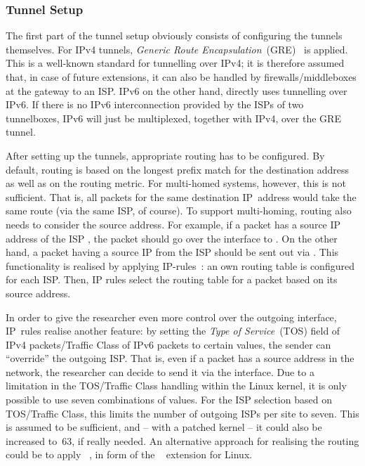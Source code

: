 \subsubsection{Tunnel Setup}

The first part of the tunnel setup obviously consists of configuring the tunnels themselves. For IPv4 tunnels, \emph{Generic Route Encapsulation}~(GRE)~\cite{RFC2784} is applied. This is a well-known standard for tunnelling over IPv4; it is therefore assumed that, in case of future extensions, it can also be handled by firewalls/middleboxes at the gateway to an ISP. IPv6 on the other hand, directly uses tunnelling over IPv6. If there is no IPv6 interconnection provided by the ISPs of two tunnelboxes, IPv6 will just be multiplexed, together with IPv4, over the GRE tunnel.

After setting up the tunnels, appropriate routing has to be configured. By default, routing is based on the longest prefix match for the destination address as well as on the routing metric. For multi-homed systems, however, this is not sufficient. That is, all packets for the same destination IP~address would take the same route (via the same ISP, of course). To support multi-homing, routing also needs to consider the source address. For example, if a packet has a source IP address of the ISP , the packet should go over the interface to . On the other hand, a packet having a source IP from the ISP  should be sent out via . This functionality is realised by applying IP-rules~\cite{IPLayerNetworkAdministrationWithLinux}: an own routing table is configured for each ISP. Then, IP rules select the routing table for a packet based on its source address.

In order to give the researcher even more control over the outgoing interface, IP~rules realise another feature: by setting the \emph{Type of Service}~(TOS) field of IPv4 packets/Traffic Class of IPv6 packets to certain values, the sender can ``override'' the outgoing ISP. That is, even if a packet has a source address in the  network, the researcher can decide to send it via the  interface. Due to a limitation in the TOS/Traffic Class handling within the Linux kernel, it is only possible to use seven combinations of values. For the ISP selection based on TOS/Traffic Class, this limits the number of outgoing ISPs per site to seven. This is assumed to be sufficient, and -- with a patched kernel -- it could also be increased to~63, if really needed.
An alternative approach for realising the routing could be to apply ~\cite{OpenFlowSpecification1.2}, in form of the ~\cite{PGP+10} extension for Linux.

